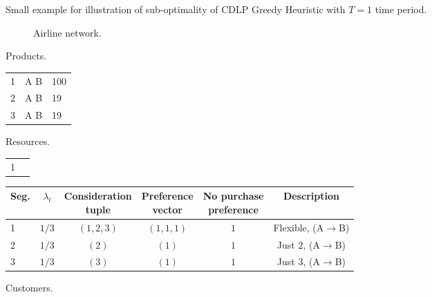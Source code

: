 \begin{figure}
	\caption{Small example for illustration of sub-optimality of CDLP Greedy Heuristic with $T=1$ time period.\label{fig-ColGen}}
	\begin{subfigure}[t]{.3\linewidth}
		\centering
		\caption{Airline network.}
	\end{subfigure}%
	\quad
	\begin{subtable}[t]{.4\linewidth}
		\caption{Products. }
		\small
		\centering
		\begin{tabular}{yxz}
			\toprule
			 &  & \\
			 & A \rightarrow B & 100\\
			2 & A \rightarrow B & 19\\
			3 & A \rightarrow B & 19\\
			\bottomrule
		\end{tabular}
	\end{subtable}%
	\quad
	\begin{subtable}[t]{.2\linewidth}
		\caption{Resources. \label{tb:AirDesc:Res}}
		\small
		\centering
		\begin{tabular}{yy}
			\toprule
			 & \\
			 & \infty\\
			\bottomrule
		\end{tabular}
	\end{subtable}
	
	\begin{subtable}{\linewidth}
		\caption{Customers.\label{tb:AirDesc:Cust}}
		\small
		\centering
		\begin{tabular}{lccccc}
			\toprule
			Seg. & $\lambda_l$ & \specialcell[b]{Consideration\\tuple} & \specialcell[b]{Preference \\vector} & \specialcell[b]{No purchase \\preference} & Description\\
			\midrule
			1 & $1/3$ & $(1, 2, 3)$ & $(1, 1, 1)$ & $1$ & Flexible, (A$\rightarrow$B)\\
			2 & $1/3$ & $(2)$ & $(1)$ & $1$ & Just $2$, (A$\rightarrow$B)\\
			3 & $1/3$ & $(3)$ & $(1)$ & $1$ & Just $3$, (A$\rightarrow$B)\\
			\bottomrule
		\end{tabular}
	\end{subtable}
\end{figure}


